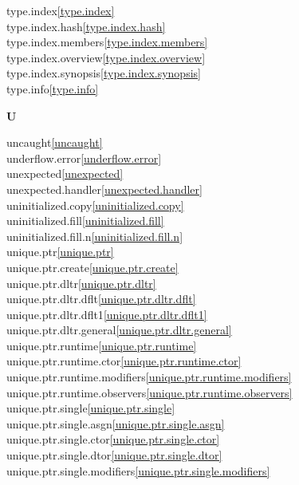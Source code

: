 \begin{multicols}{2}
type.index\quad\ref{type.index}\\
type.index.hash\quad\ref{type.index.hash}\\
type.index.members\quad\ref{type.index.members}\\
type.index.overview\quad\ref{type.index.overview}\\
type.index.synopsis\quad\ref{type.index.synopsis}\\
type.info\quad\ref{type.info}\\
\par \textbf{U}\par
uncaught\quad\ref{uncaught}\\
underflow.error\quad\ref{underflow.error}\\
unexpected\quad\ref{unexpected}\\
unexpected.handler\quad\ref{unexpected.handler}\\
uninitialized.copy\quad\ref{uninitialized.copy}\\
uninitialized.fill\quad\ref{uninitialized.fill}\\
uninitialized.fill.n\quad\ref{uninitialized.fill.n}\\
unique.ptr\quad\ref{unique.ptr}\\
unique.ptr.create\quad\ref{unique.ptr.create}\\
unique.ptr.dltr\quad\ref{unique.ptr.dltr}\\
unique.ptr.dltr.dflt\quad\ref{unique.ptr.dltr.dflt}\\
unique.ptr.dltr.dflt1\quad\ref{unique.ptr.dltr.dflt1}\\
unique.ptr.dltr.general\quad\ref{unique.ptr.dltr.general}\\
unique.ptr.runtime\quad\ref{unique.ptr.runtime}\\
unique.ptr.runtime.ctor\quad\ref{unique.ptr.runtime.ctor}\\
unique.ptr.runtime.modifiers\quad\ref{unique.ptr.runtime.modifiers}\\
unique.ptr.runtime.observers\quad\ref{unique.ptr.runtime.observers}\\
unique.ptr.single\quad\ref{unique.ptr.single}\\
unique.ptr.single.asgn\quad\ref{unique.ptr.single.asgn}\\
unique.ptr.single.ctor\quad\ref{unique.ptr.single.ctor}\\
unique.ptr.single.dtor\quad\ref{unique.ptr.single.dtor}\\
unique.ptr.single.modifiers\quad\ref{unique.ptr.single.modifiers}\\

\end{multicols}
